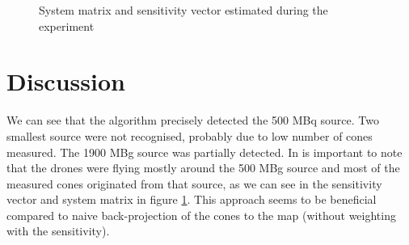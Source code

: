 \begin{figure}[!htb]
  \centering

  \label{fig:B}
  \caption{System matrix and sensitivity vector estimated during the experiment}

\end{figure}

\section{Discussion}
We can see that the algorithm precisely detected the 500 MBq source. Two smallest source were not recognised, probably due to low number of cones measured.
The 1900 MBg source was partially detected. 
In is important to note that the drones were flying mostly around the 500 MBg source and most of the measured cones originated from that source, as we can see in the sensitivity vector and system matrix in figure \ref{fig:B}.
This approach seems to be beneficial compared to naive back-projection of the cones to the map (without weighting with the sensitivity).



